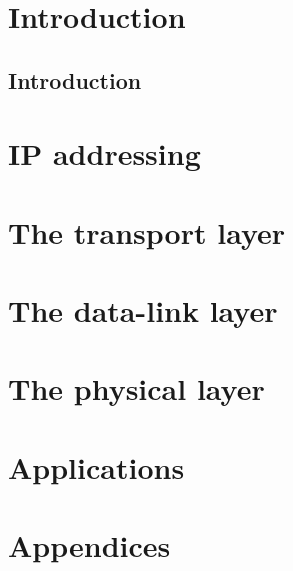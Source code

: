 \documentclass[b5paper,11pt]{memoir}
\begin{document}
\frontmatter
\tableofcontents
\clearforchapter\listoffigures
\clearforchapter\listoftables


\part{Introduction}
\chapter{Introduction}


\mainmatter
\part{IP addressing}















\part{The transport layer}
\label{part:transport-layer}

\part{The data-link layer}




\part{The physical layer}


\part{Applications}




\part{Appendices}
\appendix

\backmatter
\nocite{*}
\printbibliography
\printindex
\end{document}

